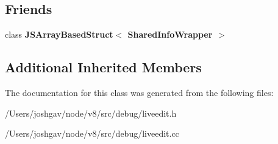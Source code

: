 \subsection*{Friends}
\begin{DoxyCompactItemize}
\item 
class {\bfseries J\+S\+Array\+Based\+Struct$<$ Shared\+Info\+Wrapper $>$}\hypertarget{classv8_1_1internal_1_1_shared_info_wrapper_a44aa8ab054415f7265444059c27b4cdc}{}\label{classv8_1_1internal_1_1_shared_info_wrapper_a44aa8ab054415f7265444059c27b4cdc}

\end{DoxyCompactItemize}
\subsection*{Additional Inherited Members}


The documentation for this class was generated from the following files\+:\begin{DoxyCompactItemize}
\item 
/\+Users/joshgav/node/v8/src/debug/liveedit.\+h\item 
/\+Users/joshgav/node/v8/src/debug/liveedit.\+cc\end{DoxyCompactItemize}
